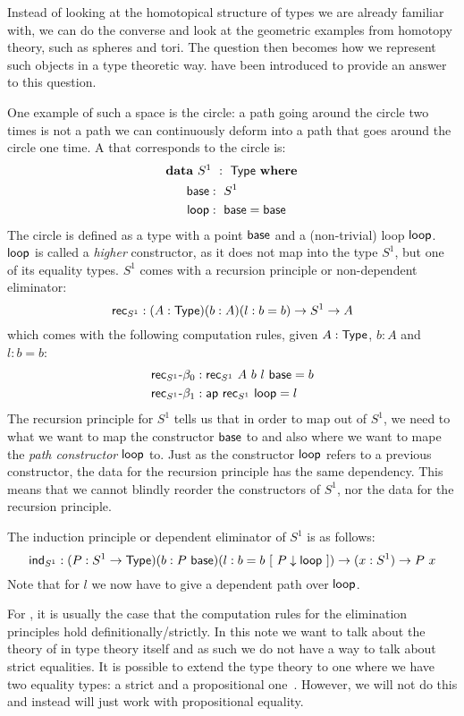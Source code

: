 \documentclass[a4paper,10pt]{report}
\begin{document}
Instead of looking at the homotopical structure of types we are
already familiar with, we can do the converse and look at the
geometric examples from homotopy theory, such as spheres and tori. The
question then becomes how we represent such objects in a type
theoretic way. \Hits have been introduced to provide an answer to this
question.

One example of such a space is the circle: a path going around the
circle two times is not a path we can continuously deform into a path
that goes around the circle one time. A \hit that corresponds to the
circle is:
%
\begin{alignat*}{2}
  &\rlap{$\data\ S^1\ :\ \Type\ \where$} \\
  &&\ \ \base     &:\ S^1 \\
  &&\ \ \loopcstr &:\ \base = \base
\end{alignat*}
%
The circle is defined as a type with a point $\mathsf{base}$ and a
(non-trivial) loop $\mathsf{loop}$. $\mathsf{loop}$ is called a \emph{higher}
constructor, as it does not map into the type $S^1$, but one of its
equality types. $S^1$ comes with a recursion principle or
non-dependent eliminator:
$$
\mathsf{rec}_{S^1} : (A : \mathsf{Type}) (b : A) (l : b = b) \to S^1 \to A
$$
which comes with the following computation rules, given $A : \mathsf{Type}$,
$b : A$ and $l : b = b$:
%
\begin{align*}
&\mathsf{rec}_{S^1}\mbox{-}\beta_0 : \mathsf{rec}_{S^1}\ A\ b\ l\ \mathsf{base} = b \\
&\mathsf{rec}_{S^1}\mbox{-}\beta_1 : \mathsf{ap}\ \mathsf{rec}_{S^1}\ \mathsf{loop} = l
\end{align*}
%
The recursion principle for $S^1$ tells us that in order to map out of
$S^1$, we need to what we want to map the constructor $\mathsf{base}$ to and
also where we want to mape the \emph{path constructor} $\mathsf{loop}$
to. Just as the constructor $\mathsf{loop}$ refers to a previous
constructor, the data for the recursion principle has the same
dependency. This means that we cannot blindly reorder the constructors
of $S^1$, nor the data for the recursion principle.

The induction principle or dependent eliminator of $S^1$ is as
follows:
$$
\mathsf{ind}_{S^1} : (P : S^1 \to \mathsf{Type}) (b : P\ \mathsf{base}) (l : b = b\ [\ P \downarrow \mathsf{loop}\ ]) \to (x : S^1) \to P\ x
$$
Note that for $l$ we now have to give a dependent path over
$\mathsf{loop}$.

For \oits, it is usually the case that the computation rules for the
elimination principles hold definitionally/strictly. In this note we
want to talk about the theory of \hits in type theory itself and as
such we do not have a way to talk about strict equalities. It is
possible to extend the type theory to one where we have two equality
types: a strict and a propositional one~\cite{Voevodsky2013}. However,
we will not do this and instead will just work with propositional
equality.
\end{document}
